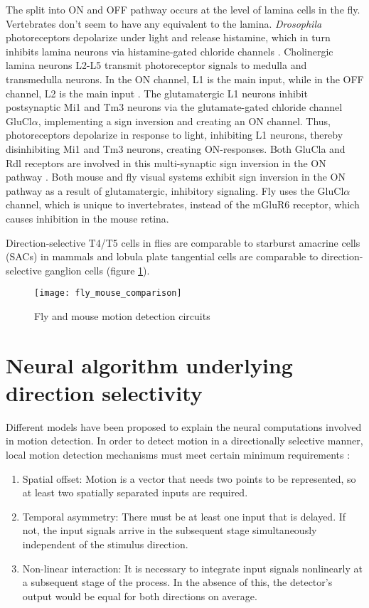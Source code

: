 The split into ON and OFF pathway occurs at the level of lamina cells in the fly. Vertebrates don't seem to have any equivalent to the lamina. \textit{Drosophila} photoreceptors depolarize under light and release histamine, which in turn inhibits lamina neurons via histamine-gated chloride channels \parencite{Hardie1989}. Cholinergic lamina neurons L2-L5 transmit photoreceptor signals to medulla and transmedulla neurons. In the ON channel, L1 is the main input, while in the OFF channel, L2 is the main input \parencite{Joesch2010}. The glutamatergic L1 neurons inhibit postsynaptic Mi1 and Tm3 neurons via the glutamate-gated chloride channel GluCl$\alpha$, implementing a sign inversion and creating an ON channel. Thus, photoreceptors depolarize in response to light, inhibiting L1 neurons, thereby disinhibiting Mi1 and Tm3 neurons, creating ON-responses. Both GluCla and Rdl receptors are involved in this multi-synaptic sign inversion in the ON pathway \parencite{Molina2019}. Both mouse and fly visual systems exhibit sign inversion in the ON pathway as a result of glutamatergic, inhibitory signaling. Fly uses the GluCl$\alpha$ channel, which is unique to invertebrates, instead of the mGluR6 receptor, which causes inhibition in the mouse retina.

Direction-selective T4/T5 cells in flies are comparable to starburst amacrine cells (SACs) in mammals and lobula plate tangential cells are comparable to direction-selective ganglion cells (figure \ref{fig:flymouse}).
\begin{figure}
\centering
\hspace*{-2cm} 
\texttt{[image: fly\_mouse\_comparison]}
\caption[Fly and mouse motion detection circuits] {Fly and mouse motion detection circuits}
\label{fig:flymouse}
\end{figure}
\section{Neural algorithm underlying direction selectivity}
Different models have been proposed to explain the neural computations involved in motion detection. In order to detect motion in a directionally selective manner, local motion detection mechanisms must meet certain minimum requirements \parencite{Borst1989}:
\begin{enumerate}
\item Spatial offset: Motion is a vector that needs two points to be represented, so at least two spatially separated inputs are required.
\item Temporal asymmetry: There must be at least one input that is delayed. If not, the input signals arrive in the subsequent stage simultaneously independent of the stimulus direction.
\item Non-linear interaction: It is necessary to integrate input signals nonlinearly at a subsequent stage of the process. In the absence of this, the detector's output would be equal for both directions on average.
\end{enumerate} 

